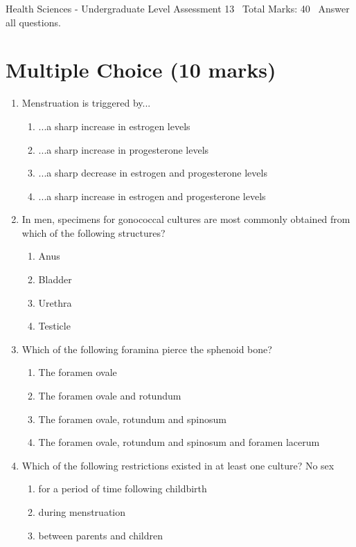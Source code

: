 \documentclass[12pt]{article}
\begin{document}
\begin{center}
Health Sciences - Undergraduate Level Assessment 13 \
Total Marks: 40 \
Answer all questions.
\end{center}

\section*{Multiple Choice (10 marks)}
\begin{enumerate}[label=\arabic*.]
\item Menstruation is triggered by...
\begin{enumerate}[label=(\alph*)]
    \item ...a sharp increase in estrogen levels
    \item ...a sharp increase in progesterone levels
    \item ...a sharp decrease in estrogen and progesterone levels
    \item ...a sharp increase in estrogen and progesterone levels
\end{enumerate}
\item In men, specimens for gonococcal cultures are most commonly obtained from which of the following structures?
\begin{enumerate}[label=(\alph*)]
    \item Anus
    \item Bladder
    \item Urethra
    \item Testicle
\end{enumerate}
\item Which of the following foramina pierce the sphenoid bone?
\begin{enumerate}[label=(\alph*)]
    \item The foramen ovale
    \item The foramen ovale and rotundum
    \item The foramen ovale, rotundum and spinosum
    \item The foramen ovale, rotundum and spinosum and foramen lacerum
\end{enumerate}
\item Which of the following restrictions existed in at least one culture? No sex
\begin{enumerate}[label=(\alph*)]
    \item for a period of time following childbirth
    \item during menstruation
    \item between parents and children

\end{enumerate}
\end{enumerate}
\end{document}

